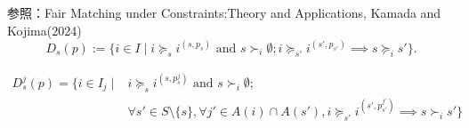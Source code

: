 \documentclass[a4j,10pt]{jsarticle}
\theoremstyle{definition}
\theoremstyle{remark}
\theoremstyle{plain}
\begin{document}
\begin{tcolorbox}[enhanced,breakable=true]
参照：Fair Matching under Constraints:Theory and Applications, Kamada and Kojima(2024)
\[
  D_s(p) := \{i \in I \mid i \succeq_s i^{(s,p_s)} \text{ and } s \succ_i \emptyset; i \succeq_{s'} i^{(s',p_{s'})} \implies s \succeq_i s' \}.
\]







\begin{align*}
  D^j_s(p) = \{ i \in I_j \mid &i \succeq_s i^{(s,p^j_s)} \text{ and } s \succ_i \emptyset ;\\ &\forall s' \in S\setminus \{s\},\forall j' \in A(i) \cap A(s'), i \succeq_{s'} i^{(s',p^{j'}_{s'})} \implies s \succ_i s' \}
\end{align*}


\end{tcolorbox}
\end{document}
